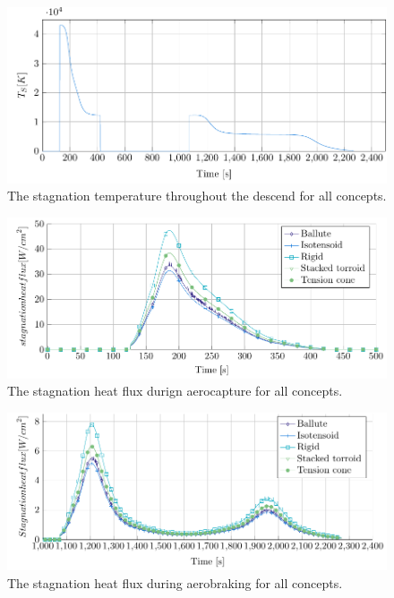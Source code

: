 \begin{figure}[H]
	\centering
	\includegraphics{Figure/stagnationtemp.pdf}
	\caption{The stagnation temperature throughout the descend for all concepts.}
	\label{fig:stagnationtemp}
\end{figure}

\begin{figure}[H]
	\centering
	\includegraphics{Figure/heatflux1.pdf}
	\caption{The stagnation heat flux durign aerocapture for all concepts.}
	\label{fig:stagflux1}
\end{figure}

\begin{figure}[H]
	\centering
	\includegraphics{Figure/heatflux2.pdf}
	\caption{The stagnation heat flux during aerobraking for all concepts.}
	\label{fig:stagflux2}
\end{figure}

